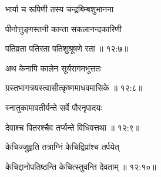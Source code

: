 {\devanagarifont भार्या च रूपिणी तस्य चन्द्रबिम्बशुभानना \thinspace{\dandab} \dontdisplaylinenum }%

{\devanagarifont पीनोत्तुङ्गस्तनी कान्ता सकलानन्दकारिणी  \danda\dontdisplaylinenum }%


{\devanagarifont पतिव्रता पतिरता पतिशुश्रूषणे रता {॥ १२:७॥} \veg\dontdisplaylinenum }%

{\devanagarifont अथ केनापि कालेन सूर्यरागमभूत्ततः \thinspace{\dandab} \dontdisplaylinenum }%


{\devanagarifont ग्रस्तभागत्रयस्त्वासीत्कृष्णमाधवमासिके {॥ १२:८॥} \veg\dontdisplaylinenum }%
 
{\devanagarifont स्नातुकामावतीर्यन्ते सर्वे पौरनृपादयः \thinspace{\dandab} \dontdisplaylinenum }%


{\devanagarifont देवाश्च पितरश्चैव तर्प्यन्ते विधिवत्तथा {॥ १२:९॥} \veg\dontdisplaylinenum }%

{\devanagarifont केचिज्जुह्वति तत्राग्निं केचिद्विप्रांश्च तर्पयेत् \thinspace{\dandab} \dontdisplaylinenum }%


{\devanagarifont केचिद्दानोपतिष्ठन्ति केचित्स्तुवन्ति देवताम् {॥ १२:१०॥} \veg\dontdisplaylinenum }%

